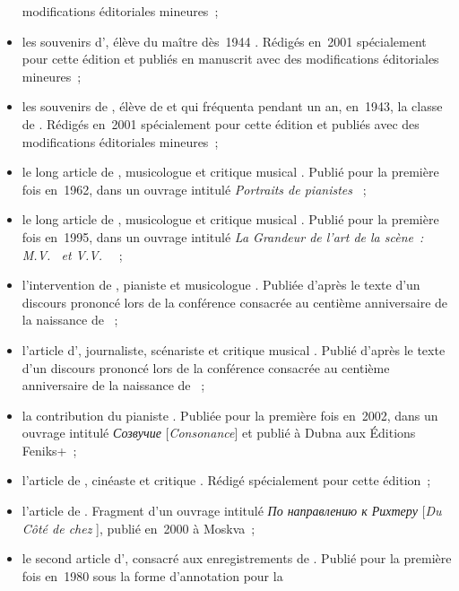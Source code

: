 \begin{itemize}
 modifications éditoriales mineures~;
 \item
 les souvenirs d'\OTrazevskaya{}, élève du maître dès~1944
 \citep{Trazevskaya08}.
 Rédigés en~2001 spécialement pour cette édition et publiés en manuscrit
 avec des modifications éditoriales mineures~;
 \item
 les souvenirs de \LFichtengoltz{}, élève de \HNeuhaus{} et qui fréquenta
 pendant un an, en~1943, la classe de \VSofronitsky{}
 \citep{Fichtengoltz08}.
 Rédigés en~2001 spécialement pour cette édition et publiés avec des
 modifications éditoriales mineures~;
 \item
 le long article de \DRabinovitch{}, musicologue et critique musical
 \citep{Rabinovich08}.
 Publié pour la première fois en~1962, dans un ouvrage intitulé
 \emph{Portraits de pianistes} \citep[voir][]{Rabinovich62}~;
 \item
 le long article de \LGakkel{}, musicologue et critique musical
 \citep{Gakkel08}.
 Publié pour la première fois en~1995, dans un ouvrage intitulé \emph{La
 Grandeur de l'art de la scène~: M.V.\@~\Yudina{} et V.V.\@~\Sofronitsky{}}
 \citep[voir][]{Gakkel95}~;
 \item
 l'intervention de \VChinaiev{}, pianiste et musicologue \citep{Chinaiev08}.
 Publiée d'après le texte d'un discours prononcé lors de la conférence
 consacrée au centième anniversaire de la naissance de \VSofronitsky{}~;
 \item
 l'article d'\AZolotov{}, journaliste, scénariste et critique musical
 \citep{Zolotov08}.
 Publié d'après le texte d'un discours prononcé lors de la conférence
 consacrée au centième anniversaire de la naissance de \VSofronitsky{}~;
 \item
 la contribution du pianiste \MKonchalovsky{} \citep{Konchalovsky08}.
 Publiée pour la première fois en~2002, dans un ouvrage intitulé
 \emph{\foreignlanguage{russian}{Созвучие}} [\emph{Consonance}] et publié à
 Dubna aux Éditions Feniks+~;
 \item
 l'article de \RYourenev{}, cinéaste et critique \citep{Yurenev08}.
 Rédigé spécialement pour cette édition~;
 \item
 l'article de \YBorisov{} \citep{Borisov08}.
 Fragment d'un ouvrage intitulé \emph{\foreignlanguage{russian}{По
 направлению к Рихтеру}} [\emph{Du Côté de chez \Richter{}}], publié en~2000
 à Moskva~;
 \item
 le second article d'\INikonovich{}, consacré aux enregistrements de
 \VSofronitsky{} \citep{Nikonovich08b}.
 Publié pour la première fois en~1980 sous la forme d'annotation pour la

\end{itemize}

